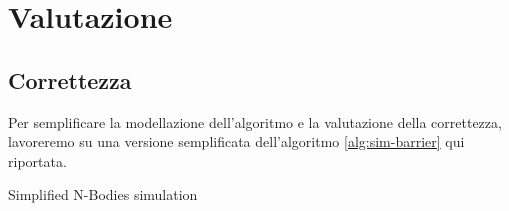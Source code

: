 \documentclass[12pt,a4paper,oneside]{article}
\begin{document}
	\section{Valutazione}
	\subsection{Correttezza}
	\hfill
	\begin{minipage}{.55\textwidth}
		Per semplificare la modellazione dell'algoritmo e la valutazione della correttezza, lavoreremo su una versione semplificata dell'algoritmo \ref{alg:sim-barrier} qui riportata.
	\end{minipage}
	\hfill
	\begin{minipage}{.4\textwidth}
		\begin{algorithm}[H]
			\caption{Simplified N-Bodies simulation}
		\end{algorithm}
	\end{minipage}
	\hfill
	
\end{document}
